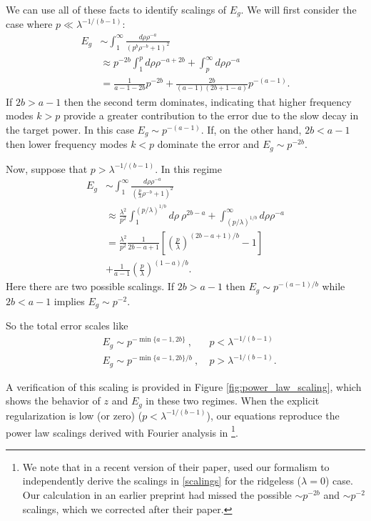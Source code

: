 \documentclass{article}
\begin{document}
We can use all of these facts to identify scalings of $E_g$. We will first consider the case where $p \ll \lambda^{-1/(b-1)}$:
\begin{align}
    E_g &\sim \int_{1}^{\infty} \frac{d\rho \rho^{-a} }{(p^b \rho^{-b} + 1)^2}  \nonumber
    \\
    &\approx p^{-2b} \int_1^{p} d\rho \rho^{-a+2b} + \int_p^\infty d\rho \rho^{-a} \nonumber
    \\
    & = \frac{1}{a-1-2b} p^{-2b} + \frac{2b}{(a-1)(2b+1-a)} p^{-(a-1)}.
\end{align}
If $2b > a-1$ then the second term dominates, indicating that higher frequency modes $k > p$ provide a greater contribution to the error due to the slow decay in the target power. In this case $E_g \sim p^{-(a-1)} $. If, on the other hand, $2b < a-1$ then lower frequency modes $k < p$ dominate the error and $E_g \sim p^{-2b}$. 

Now, suppose that $p > \lambda^{-1/(b-1)}$.  In this regime 
\begin{align}
    E_g &\sim \int_1^\infty \frac{d\rho \rho^{-a}}{( \frac{p}{\lambda} \rho^{-b} +1 )^2} \nonumber
    \\
    &\approx \frac{\lambda^2}{p^2} \int_1^{(p/\lambda)^{1/b}} d\rho \ \rho^{2b-a} + \int_{(p/\lambda)^{1/b}}^\infty d\rho \rho^{-a} \nonumber
    \\
    &= \frac{\lambda^2}{p^2} \frac{1}{2b-a+1} \left[ \left(\frac{p}{\lambda} \right)^{(2b-a+1)/b} - 1 \right] \nonumber
    \\
    &+ \frac{1}{a-1} \left( \frac{p}{\lambda} \right)^{(1-a)/b}.
\end{align}
%
Here there are two possible scalings. If $2b > a-1$ then $E_g \sim p^{-(a-1)/b}$ while $2b < a-1$ implies $E_g \sim p^{-2}$. 

So the total error scales like
\begin{align}\label{scalings}
    &E_g \sim p^{- \min\{a-1, 2b\}} \ , \ &p < \lambda^{-1/(b-1)} \nonumber
    \\
   & E_g \sim  p^{- \min\{a-1,2b \}/b} \ , \ &p > \lambda^{-1/(b-1)}.
\end{align}

A verification of this scaling is provided in Figure \ref{fig:power_law_scaling}, which shows the behavior of $z$ and $E_g$ in these two regimes. When the explicit regularization is low (or zero) ($p<\lambda^{-1/(b-1)}$), our equations reproduce the power law scalings derived with Fourier analysis in \cite{spigler2019asymptotic}\footnote{We note that in a recent version of their paper, \citet{spigler2019} used our formalism to independently derive the scalings in \eqref{scalings} for the ridgeless ($\lambda=0$) case. Our calculation in an earlier preprint had missed the possible $\sim p^{-2b}$ and $\sim p^{-2}$ scalings, which we corrected after their paper.}.
\end{document}
